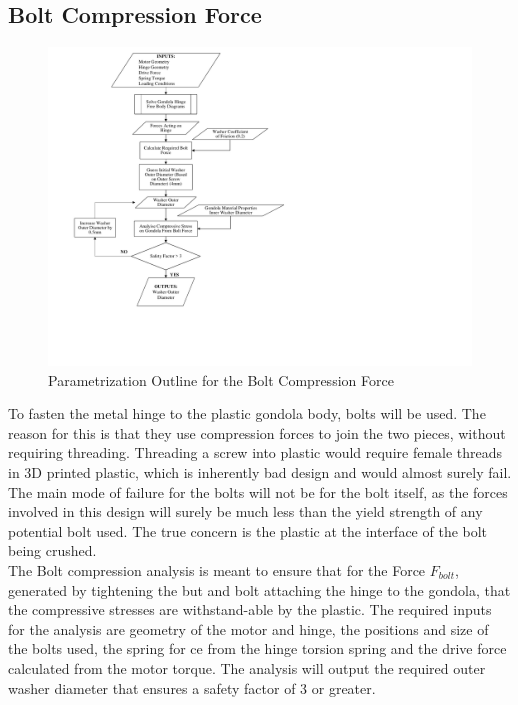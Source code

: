 \documentclass[../main.tex]{subfiles}
\begin{document}
\subsection{Bolt Compression Force} \label{compressive}

\begin{figure}[H]
	\centering
	\includegraphics[width=.9\linewidth]{img/paramaterization/compressionBolt.pdf}
	\caption{Parametrization Outline for the Bolt Compression Force}
	\label{fig:boltCompressionParametrization}
\end{figure}

To fasten the metal hinge to the plastic gondola body, bolts will be used. The reason for this is that they use compression forces to join the two pieces, without requiring threading. Threading a screw into plastic would require female threads in 3D printed plastic, which is inherently bad design and would almost surely fail. \\

The main mode of failure for the bolts will not be for the bolt itself, as the forces involved in this design will surely be much less than the yield strength of any potential bolt used. The true concern is the plastic at the interface of the bolt being crushed. \\

The Bolt compression analysis is meant to ensure that for the Force $F_{bolt}$, generated by tightening the but and bolt attaching the hinge to the gondola, that the compressive stresses are withstand-able by the plastic. The required inputs for the analysis are geometry of the motor and hinge, the positions and size of the bolts used, the spring for ce from the hinge torsion spring and the drive force calculated from the motor torque. The analysis will output the required outer washer diameter that ensures a safety factor of 3 or greater. 
  
\end{document}
